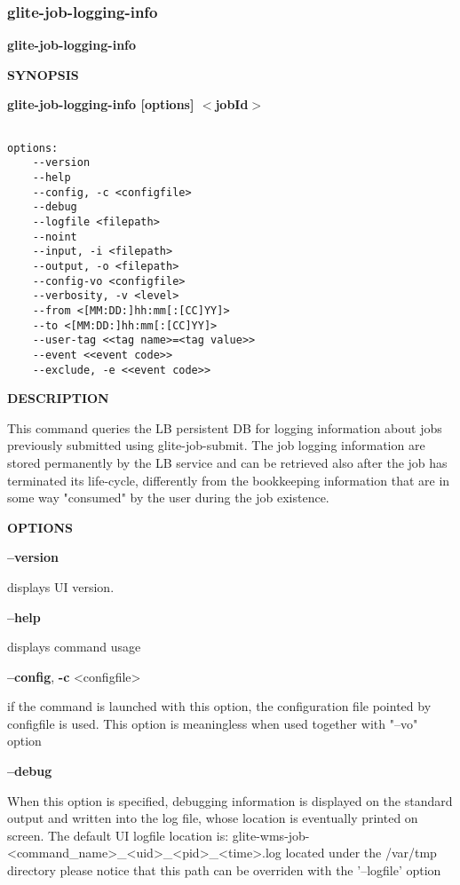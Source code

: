 \subsubsection{glite-job-logging-info}
\label{glite-job-logging-info}

\medskip
\textbf{glite-job-logging-info}
\smallskip


\medskip
\textbf{SYNOPSIS}
\smallskip

\textbf{glite-job-logging-info [options] $<$jobId$>$}
{\begin{verbatim}

options:
	--version
	--help
	--config, -c <configfile>
	--debug
	--logfile <filepath>
	--noint
	--input, -i <filepath>
	--output, -o <filepath>
	--config-vo <configfile>
	--verbosity, -v <level>
	--from <[MM:DD:]hh:mm[:[CC]YY]>
	--to <[MM:DD:]hh:mm[:[CC]YY]>
	--user-tag <<tag name>=<tag value>>
	--event <<event code>>
	--exclude, -e <<event code>>
\end{verbatim}

\medskip
\textbf{DESCRIPTION}
\smallskip


This command queries the LB persistent DB for logging information about jobs previously submitted using glite-job-submit.
The job logging information are stored permanently by the LB service and can be retrieved also after the job has terminated its life-cycle, differently from the bookkeeping information that are in some way "consumed" by the user during the job existence.

\medskip
\textbf{OPTIONS}
\smallskip

\textbf{--version}

displays UI version.

\textbf{--help}

displays command usage

\textbf{--config}, \textbf{-c} <configfile>

if the command is launched with this option, the configuration file pointed by configfile is used. This option is meaningless when used together with "--vo" option

\textbf{--debug}

When this option is specified, debugging information is displayed on the standard output and written into the log file, whose location is eventually printed on screen.
The default UI logfile location is:
glite-wms-job-<command\_name>\_<uid>\_<pid>\_<time>.log  located under the /var/tmp directory
please notice that this path can be overriden with the '--logfile' option

}
